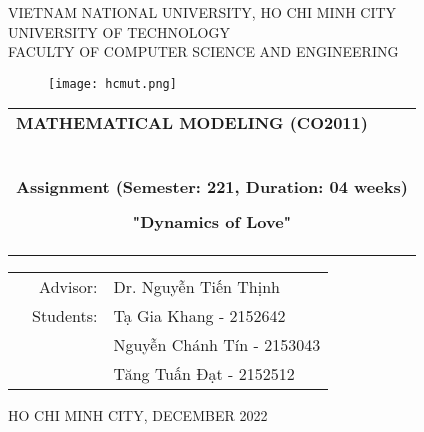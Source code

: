\documentclass[a4paper]{article}
\begin{document}
\begin{titlepage}
\begin{center}
VIETNAM NATIONAL UNIVERSITY, HO CHI MINH CITY \\
UNIVERSITY OF TECHNOLOGY \\
FACULTY OF COMPUTER SCIENCE AND ENGINEERING
\end{center}

\vspace{1cm}

\begin{figure}[h!]
\begin{center}
\texttt{[image: hcmut.png]}
\end{center}
\end{figure}

\vspace{1cm}


\begin{center}
\begin{tabular}{c}
\multicolumn{1}{l}{\textbf{{\Large MATHEMATICAL MODELING (CO2011)}}}\\
~~\\
\hline
\\
\multicolumn{1}{l}{\textbf{{\Large Assignment (Semester: 221, Duration: 04 weeks)}}}\\
\\
\textbf{{\Huge "Dynamics of Love"}}\\
\\
\textbf{{\Huge	}}\\
\\
\hline
\end{tabular}
\end{center}

\vspace{3cm}

\begin{table}[h]
\begin{tabular}{rrl}
\hspace{5 cm} & Advisor: & Dr. Nguyễn Tiến Thịnh\\
& Students: & Tạ Gia Khang - 2152642 \\
& & Nguyễn Chánh Tín - 2153043 \\
& & Tăng Tuấn Đạt - 2152512 \\
\end{tabular}
\end{table}

\begin{center}
{\footnotesize HO CHI MINH CITY, DECEMBER 2022}
\end{center}
\end{titlepage}
\end{document}
